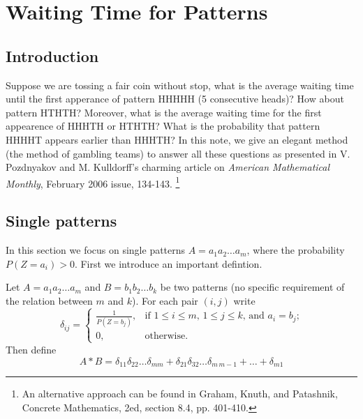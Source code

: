 \chapter{Waiting Time for Patterns}

\section{Introduction}
Suppose we are tossing a fair coin without stop, what is the average waiting
time until the first apperance of pattern HHHHH (5 consecutive heads)?
How about pattern HTHTH? Moreover, what is the average waiting time for the
first appearence of HHHTH or HTHTH? What is the probability that pattern HHHHT
appears earlier than HHHTH? In this note, we give an elegant method (the method
of gambling teams) to answer all these questions as presented in V. Pozdnyakov
and M. Kulldorff's charming article on \textit{American Mathematical Monthly},
February 2006 issue, 134-143.
\footnote{An alternative approach can be found in Graham, Knuth, and Patashnik,
Concrete Mathematics, 2ed, section 8.4, pp. 401-410.}


\section{Single patterns}
In this section we focus on single patterns $A=a_1 a_2 \dots a_m$, where the
probability $P(Z=a_i)>0$. First we introduce an important defintion.

\begin{definition}
Let $A=a_1 a_2 \dots a_m$ and $B=b_1 b_2 \dots b_k$ be two patterns (no specific
requirement of the relation between $m$ and $k$). For each pair $(i,j)$ write
\begin{equation}
  \delta_{ij}=
  \begin{cases}
    \frac{1}{P(Z=b_j)},  &\text{if $1 \le i \le m$, $1\le j \le k$, and
                               $a_i=b_j$;}  \\
    0,                   &\text{otherwise.}
  \end{cases}
\end{equation}
Then define
\begin{equation}
  A\ast B = \delta_{11} \delta_{22} \dots \delta_{mm}
            + \delta_{21} \delta_{32} \dots \delta_{m\, m-1} 
            + \dots + \delta_{m1}
\end{equation}
\end{definition}


